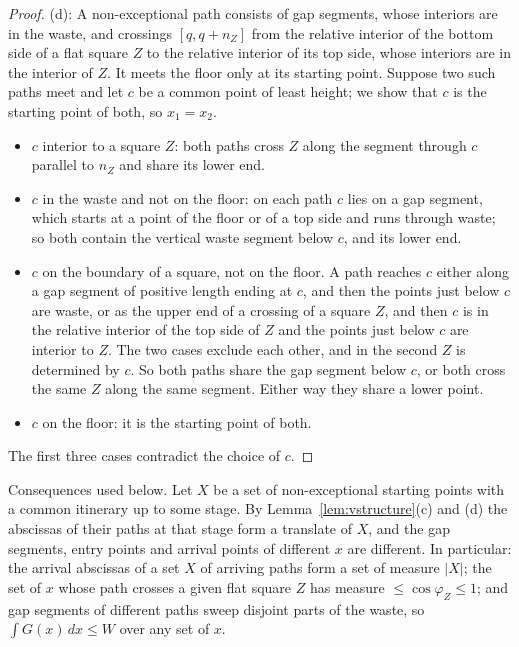 \documentclass[11pt,letterpaper]{amsart}
\theoremstyle{plain}
\theoremstyle{definition}
\theoremstyle{remark}
\begin{document}
\begin{proof}
(d): A non-exceptional path consists of gap segments, whose interiors are in the waste, and crossings $[q,q+n_Z]$ from the relative interior of the bottom side of a flat square $Z$ to the relative interior of its top side, whose interiors are in the interior of $Z$. It meets the floor only at its starting point. Suppose two such paths meet and let $c$ be a common point of least height; we show that $c$ is the starting point of both, so $x_1=x_2$.
\begin{itemize}
\item $c$ interior to a square $Z$: both paths cross $Z$ along the segment through $c$ parallel to $n_Z$ and share its lower end.
\item $c$ in the waste and not on the floor: on each path $c$ lies on a gap segment, which starts at a point of the floor or of a top side and runs through waste; so both contain the vertical waste segment below $c$, and its lower end.
\item $c$ on the boundary of a square, not on the floor. A path reaches $c$ either along a gap segment of positive length ending at $c$, and then the points just below $c$ are waste, or as the upper end of a crossing of a square $Z$, and then $c$ is in the relative interior of the top side of $Z$ and the points just below $c$ are interior to $Z$. The two cases exclude each other, and in the second $Z$ is determined by $c$. So both paths share the gap segment below $c$, or both cross the same $Z$ along the same segment. Either way they share a lower point.
\item $c$ on the floor: it is the starting point of both.
\end{itemize}
The first three cases contradict the choice of $c$.
\end{proof}

Consequences used below. Let $X$ be a set of non-exceptional starting points with a common itinerary up to some stage. By Lemma~\ref{lem:vstructure}(c) and (d) the abscissas of their paths at that stage form a translate of $X$, and the gap segments, entry points and arrival points of different $x$ are different. In particular: the arrival abscissas of a set $X$ of arriving paths form a set of measure $|X|$; the set of $x$ whose path crosses a given flat square $Z$ has measure $\le\cos\varphi_Z\le1$; and gap segments of different paths sweep disjoint parts of the waste, so $\int G(x)\,dx\le W$ over any set of $x$.
\end{document}
